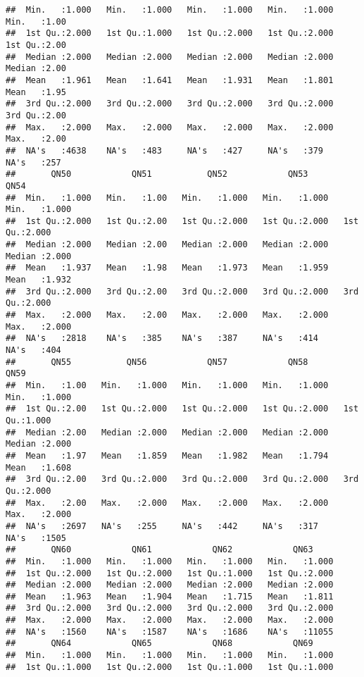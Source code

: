 \documentclass[
]{article}
\begin{document}
\begin{verbatim}
##  Min.   :1.000   Min.   :1.000   Min.   :1.000   Min.   :1.000   Min.   :1.00  
##  1st Qu.:2.000   1st Qu.:1.000   1st Qu.:2.000   1st Qu.:2.000   1st Qu.:2.00  
##  Median :2.000   Median :2.000   Median :2.000   Median :2.000   Median :2.00  
##  Mean   :1.961   Mean   :1.641   Mean   :1.931   Mean   :1.801   Mean   :1.95  
##  3rd Qu.:2.000   3rd Qu.:2.000   3rd Qu.:2.000   3rd Qu.:2.000   3rd Qu.:2.00  
##  Max.   :2.000   Max.   :2.000   Max.   :2.000   Max.   :2.000   Max.   :2.00  
##  NA's   :4638    NA's   :483     NA's   :427     NA's   :379     NA's   :257   
##       QN50            QN51           QN52            QN53            QN54      
##  Min.   :1.000   Min.   :1.00   Min.   :1.000   Min.   :1.000   Min.   :1.000  
##  1st Qu.:2.000   1st Qu.:2.00   1st Qu.:2.000   1st Qu.:2.000   1st Qu.:2.000  
##  Median :2.000   Median :2.00   Median :2.000   Median :2.000   Median :2.000  
##  Mean   :1.937   Mean   :1.98   Mean   :1.973   Mean   :1.959   Mean   :1.932  
##  3rd Qu.:2.000   3rd Qu.:2.00   3rd Qu.:2.000   3rd Qu.:2.000   3rd Qu.:2.000  
##  Max.   :2.000   Max.   :2.00   Max.   :2.000   Max.   :2.000   Max.   :2.000  
##  NA's   :2818    NA's   :385    NA's   :387     NA's   :414     NA's   :404    
##       QN55           QN56            QN57            QN58            QN59      
##  Min.   :1.00   Min.   :1.000   Min.   :1.000   Min.   :1.000   Min.   :1.000  
##  1st Qu.:2.00   1st Qu.:2.000   1st Qu.:2.000   1st Qu.:2.000   1st Qu.:1.000  
##  Median :2.00   Median :2.000   Median :2.000   Median :2.000   Median :2.000  
##  Mean   :1.97   Mean   :1.859   Mean   :1.982   Mean   :1.794   Mean   :1.608  
##  3rd Qu.:2.00   3rd Qu.:2.000   3rd Qu.:2.000   3rd Qu.:2.000   3rd Qu.:2.000  
##  Max.   :2.00   Max.   :2.000   Max.   :2.000   Max.   :2.000   Max.   :2.000  
##  NA's   :2697   NA's   :255     NA's   :442     NA's   :317     NA's   :1505   
##       QN60            QN61            QN62            QN63      
##  Min.   :1.000   Min.   :1.000   Min.   :1.000   Min.   :1.000  
##  1st Qu.:2.000   1st Qu.:2.000   1st Qu.:1.000   1st Qu.:2.000  
##  Median :2.000   Median :2.000   Median :2.000   Median :2.000  
##  Mean   :1.963   Mean   :1.904   Mean   :1.715   Mean   :1.811  
##  3rd Qu.:2.000   3rd Qu.:2.000   3rd Qu.:2.000   3rd Qu.:2.000  
##  Max.   :2.000   Max.   :2.000   Max.   :2.000   Max.   :2.000  
##  NA's   :1560    NA's   :1587    NA's   :1686    NA's   :11055  
##       QN64            QN65            QN68            QN69      
##  Min.   :1.000   Min.   :1.000   Min.   :1.000   Min.   :1.000  
##  1st Qu.:1.000   1st Qu.:2.000   1st Qu.:1.000   1st Qu.:1.000  

\end{verbatim}
\end{document}
